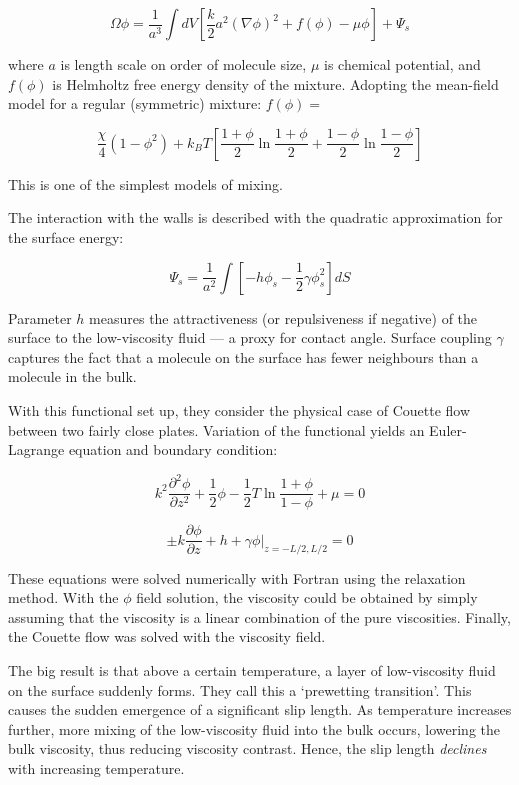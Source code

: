 \documentclass[twocolumn]{article}
\begin{document}
\[ \Omega{\phi} = \frac{1}{a^{3}} \int dV 
\left[ \frac{k}{2}a^{2} (\nabla \phi )^{2} + f(\phi) - \mu \phi \right] 
  + \Psi_{s} \]
  
where $a$ is length scale on order of molecule size, $\mu$ is chemical potential, and $f(\phi)$ is Helmholtz free energy density of the mixture. Adopting the mean-field model for a regular (symmetric) mixture: $ f(\phi) =$

\[ \frac{\chi}{4} (1-\phi^{2}) + k_{B} T \left[
\frac{1+\phi}{2} \ln \frac{1+\phi}{2} +  \frac{1-\phi}{2} \ln \frac{1-\phi}{2}    \right] \]
  
This is one of the simplest models of mixing.

The interaction with the walls is described with the quadratic approximation for the surface energy:

\[ \Psi_{s} = \frac{1}{a^{2}} \int 
\left[ -h \phi_{s} - \frac{1}{2}\gamma\phi^{2}_{s} \right] dS \]

Parameter $h$ measures the attractiveness (or repulsiveness if negative) of the surface to the low-viscosity fluid  --- a proxy for contact angle. Surface coupling $\gamma$ captures the fact that a molecule on the surface has fewer neighbours than a molecule in the bulk.

With this functional set up, they consider the physical case of Couette flow between two fairly close plates. Variation of the functional yields an Euler-Lagrange equation and boundary condition:

\[ k^{2}\frac{\partial^{2}\phi}{\partial z^{2}} + \frac{1}{2}\phi 
- \frac{1}{2} T \ln \frac{1+\phi}{1-\phi} + \mu = 0 \]

\[ \pm k \frac{\partial \phi}{\partial z} + h + \gamma \phi |_{z=-L/2,L/2} = 0\] 

These equations were solved numerically with Fortran using the relaxation method. With the $\phi$ field solution, the viscosity could be obtained by simply assuming that the viscosity is a linear combination of the pure viscosities. Finally, the Couette flow was solved with the viscosity field.

The big result is that above a certain temperature, a layer of low-viscosity fluid on the surface suddenly forms. They call this a `prewetting transition'. This causes the sudden emergence of a significant slip length. As temperature increases further, more mixing of the low-viscosity fluid into the bulk occurs, lowering the bulk viscosity, thus reducing viscosity contrast. Hence, the slip length \emph{declines} with increasing temperature.
\end{document}
